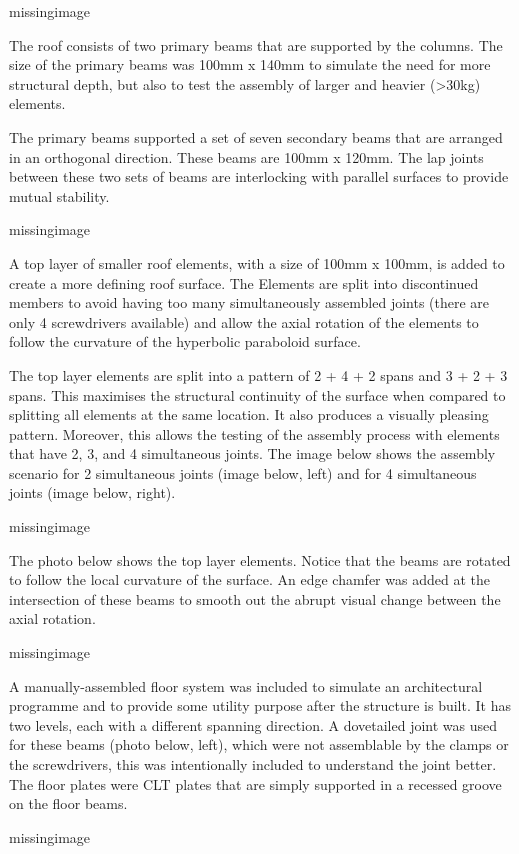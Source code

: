 missingimage

The roof consists of two primary beams that are supported by the columns. The size of the primary beams was 100mm x 140mm to simulate the need for more structural depth, but also to test the assembly of larger and heavier (>30kg) elements.

The primary beams supported a set of seven secondary beams that are arranged in an orthogonal direction. These beams are 100mm x 120mm. The lap joints between these two sets of beams are interlocking with parallel surfaces to provide mutual stability. 

missingimage

A top layer of smaller roof elements, with a size of 100mm x 100mm, is added to create a more defining roof surface. The Elements are split into discontinued members to avoid having too many simultaneously assembled joints (there are only 4 screwdrivers available) and allow the axial rotation of the elements to follow the curvature of the hyperbolic paraboloid surface. 

The top layer elements are split into a pattern of 2 + 4 + 2 spans and 3 + 2 + 3 spans. This maximises the structural continuity of the surface when compared to splitting all elements at the same location. It also produces a visually pleasing pattern. Moreover, this allows the testing of the assembly process with elements that have 2, 3, and 4 simultaneous joints. The image below shows the assembly scenario for 2 simultaneous joints (image below, left) and for 4 simultaneous joints (image below, right).

missingimage

The photo below shows the top layer elements. Notice that the beams are rotated to follow the local curvature of the surface. An edge chamfer was added at the intersection of these beams to smooth out the abrupt visual change between the axial rotation.

missingimage

A manually-assembled floor system was included to simulate an architectural programme and to provide some utility purpose after the structure is built. It has two levels, each with a different spanning direction. A dovetailed joint was used for these beams (photo below, left), which were not assemblable by the clamps or the screwdrivers, this was intentionally included to understand the joint better. The floor plates were CLT plates that are simply supported in a recessed groove on the floor beams.

missingimage

